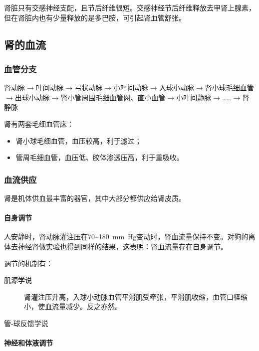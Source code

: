 肾脏只有交感神经支配，且节后纤维很短。交感神经节后纤维释放去甲肾上腺素，但在肾脏内也有少量释放的是多巴胺，可引起肾血管舒张。

\subsection{肾的血流}

\subsubsection{血管分支}

肾动脉$\longrightarrow$叶间动脉$\longrightarrow$弓状动脉$\longrightarrow$小叶间动脉$\longrightarrow$入球小动脉$\longrightarrow$肾小球毛细血管$\longrightarrow$出球小动脉$\longrightarrow$肾小管周围毛细血管网、直小血管$\longrightarrow$小叶间静脉$\longrightarrow$……$\longrightarrow$肾静脉

肾有两套毛细血管床：
\begin{itemize}
	\item 肾小球毛细血管，血压较高，利于滤过；
	\item 管周毛细血管，血压低、胶体渗透压高，利于重吸收。
\end{itemize}

\subsubsection{血流供应}

肾是机体供血最丰富的器官，其中大部分都供应给肾皮质。

\paragraph{自身调节}

人安静时，肾动脉灌注压在70\textasciitilde\SI{180}{\mm Hg}变动时，肾血流量保持不变。对狗的离体去神经肾做实验也得到同样的结果，这表明：肾血流量存在自身调节。

调节的机制有：
\begin{description}
	\item[肌源学说] 肾灌注压升高，入球小动脉血管平滑肌受牵张，平滑肌收缩，血管口径缩小，使血流量减少。反之亦然。
	\item[管-球反馈学说]
\end{description}

\paragraph{神经和体液调节}

